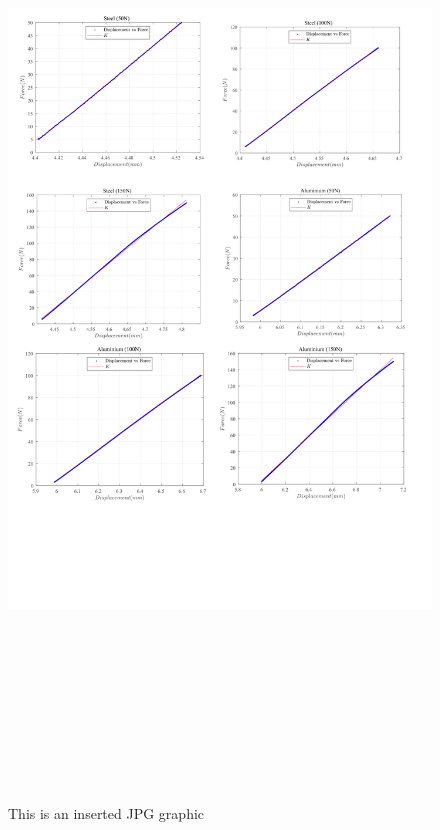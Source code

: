 \begin{figure}
    \centering
    \includegraphics[width=18.7cm,height=26cm]{./fig/mix.jpg}
    \caption{This is an inserted JPG graphic}
    \label{f1}
\end{figure}

